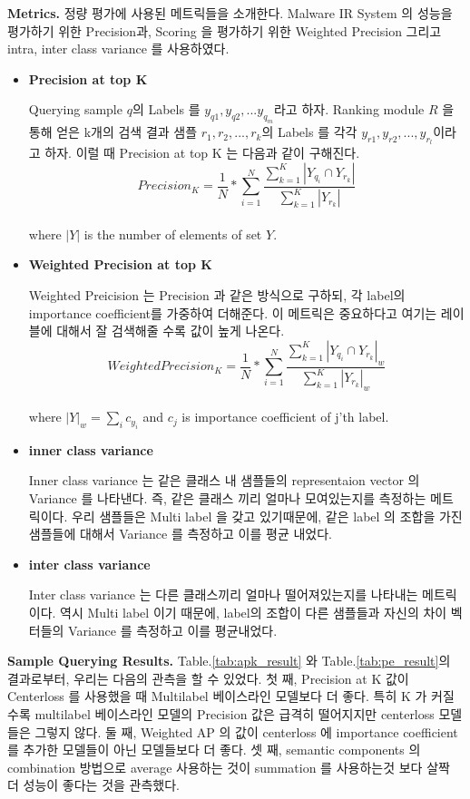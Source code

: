 \textbf{Metrics. } 정량 평가에 사용된 메트릭들을 소개한다. Malware IR System 의 성능을 평가하기 위한 Precision과, Scoring 을 평가하기 위한 Weighted Precision 그리고 intra, inter class variance 를 사용하였다. 
\begin{itemize}
	\item{ \textbf{Precision at top K} 


	Querying sample $q$의 Labels 를 $y_{q1}, y_{q2}, ... y_{q_m}$라고 하자. Ranking module $R$ 을 통해 얻은 k개의 검색 결과 샘플 $r_1, r_2, ..., r_k$의 Labels 를 각각 $y_{r1}, y_{r2}, ..., y_{r_l}$이라고 하자. 이럴 때 Precision at top K 는 다음과 같이 구해진다. 
	\[
	Precision_{K} = \frac{1}{N} *\sum_{i=1}^{N}{ \frac{ \sum_{k=1}^{K}{|Y_{q_i} \cap Y_{r_k}|}}{  \sum_{k=1}^{K}{ |Y_{r_k}| }  }}
	\]\\
	where $|Y|$ is the number of elements of set $Y$.
	}
	\item{ \textbf{Weighted Precision at top K } 
	
	Weighted Preicision 는 Precision 과 같은 방식으로 구하되, 각 label의 importance coefficient를 가중하여 더해준다. 이 메트릭은 중요하다고 여기는 레이블에 대해서 잘 검색해줄 수록 값이 높게 나온다. 
	\[
	WeightedPrecision_{K} = \frac{1}{N} *\sum_{i=1}^{N}{ \frac{ \sum_{k=1}^{K}{|Y_{q_i} \cap Y_{r_k}|_w}}{  \sum_{k=1}^{K}{ |Y_{r_k}|_w }  }}
	\]\\
	where $|Y|_w = \sum_i{c_{y_i}}$ and $c_j$ is importance coefficient of j'th label.
	}
	\item{ \textbf{inner class variance} 
	
	Inner class variance 는 같은 클래스 내 샘플들의 representaion vector 의 Variance 를 나타낸다. 즉, 같은 클래스 끼리 얼마나 모여있는지를 측정하는 메트릭이다. 우리 샘플들은 Multi label 을 갖고 있기때문에, 같은 label 의 조합을 가진 샘플들에 대해서 Variance 를 측정하고 이를 평균 내었다.   
	}
	\item{ \textbf{inter class variance} 
	
	Inter class variance 는 다른 클래스끼리 얼마나 떨어져있는지를 나타내는 메트릭이다. 역시 Multi label 이기 때문에, label의 조합이 다른 샘플들과 자신의 차이 벡터들의 Variance 를 측정하고 이를 평균내었다. 
	}
\end{itemize}


\textbf{Sample Querying Results. }
Table.\ref{tab:apk_result} 와 Table.\ref{tab:pe_result}의 결과로부터, 우리는 다음의 관측을 할 수 있었다. 
첫 째, Precision at K 값이 Centerloss 를 사용했을 때 Multilabel 베이스라인 모델보다 더 좋다. 특히 K 가 커질수록 multilabel 베이스라인 모델의 Precision 값은 급격히 떨어지지만 centerloss 모델들은 그렇지 않다. 
둘 째, Weighted AP 의 값이 centerloss 에 importance coefficient 를 추가한 모델들이 아닌 모델들보다 더 좋다. 
셋 째, semantic components 의 combination 방법으로 average 사용하는 것이 summation 를 사용하는것 보다 살짝 더 성능이 좋다는 것을 관측했다.

